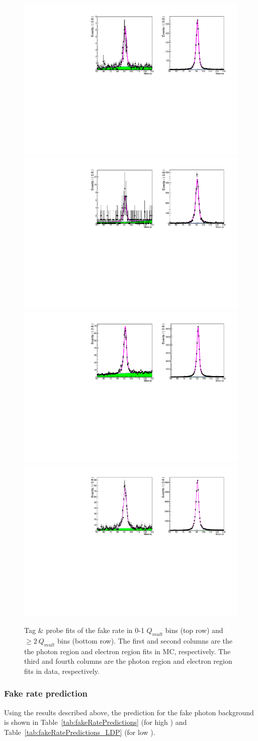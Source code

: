 \begin{figure}[h!]
\centering
\includegraphics[width=0.48\linewidth]{../Figures/Chap3/fake_rate_tag_and_probe/tag_probe_MC_fit_qmult_0_1.pdf}
\includegraphics[width=0.48\linewidth]{../Figures/Chap3/fake_rate_tag_and_probe/tag_probe_fit_qmult_0_1.pdf}\\
\includegraphics[width=0.48\linewidth]{../Figures/Chap3/fake_rate_tag_and_probe/tag_probe_MC_fit_qmult_2_100.pdf}
\includegraphics[width=0.48\linewidth]{../Figures/Chap3/fake_rate_tag_and_probe/tag_probe_fit_qmult_2_100.pdf}\\
\captionsetup{width=.9\linewidth}
\caption{Tag \& probe fits of the fake rate in 0-1 $Q_{mult}$ bins (top row) and $\geq2\ Q_{mult}$ bins (bottom row).
The first and second columns are the
the photon region and electron region fits in MC, respectively. The third and fourth columns are 
the photon region and electron region fits in data, respectively.}
\label{fig:tpFits}
\end{figure}

\subsubsection{Fake rate prediction}
Using the results described above, the prediction for the fake photon background is shown in 
Table~\ref{tab:fakeRatePredictions} (for high \dphi) and Table~\ref{tab:fakeRatePredictions_LDP} (for low \dphi).